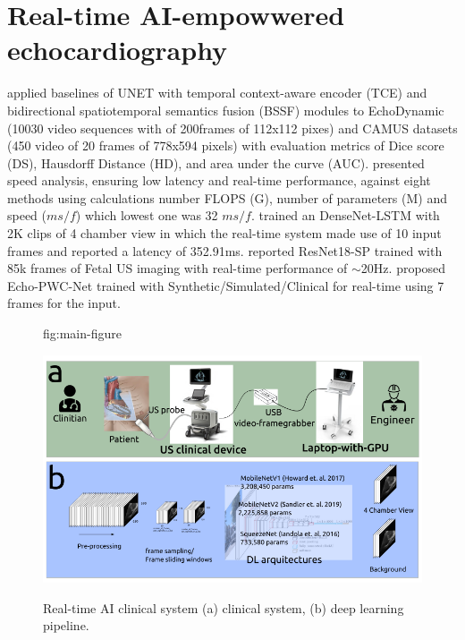 \documentclass[mlabstract,twocolumn]{jmlr}
\begin{document}
\section{Real-time AI-empowwered echocardiography}
\citet{wu2022} applied baselines of UNET with temporal context-aware encoder (TCE) and bidirectional spatiotemporal semantics fusion (BSSF) modules to EchoDynamic (10030 video sequences with of 200frames of 112x112 pixes) and CAMUS datasets  (450 video of 20 frames of 778x594 pixels) with evaluation metrics of Dice score (DS), Hausdorff Distance (HD), and area under the curve (AUC).
\citet{wu2022} presented speed analysis, ensuring low latency and real-time performance, against eight methods using calculations number FLOPS (G), number of parameters (M) and speed ($ms/f$) which lowest one was 32 $ms/f$.
\citet{woudenberg2018} trained an DenseNet-LSTM with 2K clips of 4 chamber view in which the real-time system made use of 10 input frames and reported a latency of 352.91ms.
\citet{toussaint2018-MICCAI} reported ResNet18-SP trained with 85k frames of Fetal US imaging with real-time performance of $\sim$20Hz.
\citet{ostvik2021-TMI} proposed Echo-PWC-Net trained with Synthetic/Simulated/Clinical  for real-time using 7 frames for the input.
\begin{figure}[htbp]
\floatconts
  {fig:main-figure}
  {\caption{Real-time AI clinical system (a) clinical system, (b) deep learning pipeline.}}
  {\includegraphics[width=\columnwidth]{../figures/main-figure/versions/drawing-v00}}%
\end{figure}
\end{document}
